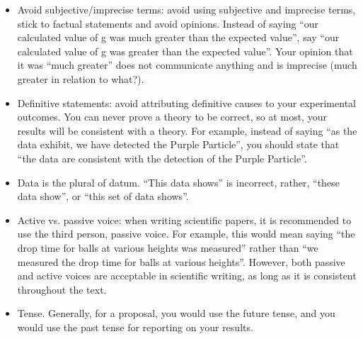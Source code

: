 \begin{itemize}
\item Avoid subjective/imprecise terms: avoid using subjective and imprecise terms, stick to factual statements and avoid opinions.  Instead of saying ``our calculated value of g was much greater than the expected value'', say ``our calculated value of g was greater than the expected value''. Your opinion that it was ``much greater'' does not communicate anything and is imprecise (much greater in relation to what?).
\item Definitive statements: avoid attributing definitive causes to your experimental outcomes. You can never prove a theory to be correct, so at most, your results will be consistent with a theory. For example, instead of saying ``as the data exhibit, we have detected the Purple Particle'', you should state that ``the data are consistent with the detection of the Purple Particle''.
\item Data is the plural of datum. ``This data shows'' is incorrect, rather, ``these data show'', or ``this set of data shows''.
\item Active vs. passive voice: when writing scientific papers, it is recommended to use the third person, passive voice. For example, this would mean saying ``the drop time for balls at various heights was measured'' rather than ``we measured the drop time for balls at various heights''. However, both passive and active voices are acceptable in scientific writing, as long as it is consistent throughout the text.
\item Tense. Generally, for a proposal, you would use the future tense, and you would use the past tense for reporting on your results.
\end{itemize}

